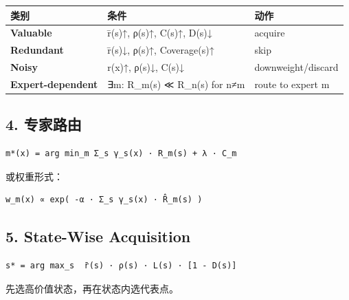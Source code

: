 \documentclass[
  12pt,
]{ctexart}
\begin{document}
\begin{longtable}[]{@{}
  >{\raggedright\arraybackslash}p{}
  >{\raggedright\arraybackslash}p{}
  >{\raggedright\arraybackslash}p{}@{}}
\toprule\noalign{}
\begin{minipage}[b]{\linewidth}\raggedright
类别
\end{minipage} & \begin{minipage}[b]{\linewidth}\raggedright
条件
\end{minipage} & \begin{minipage}[b]{\linewidth}\raggedright
动作
\end{minipage} \\
\midrule\noalign{}
\endhead
\bottomrule\noalign{}
\endlastfoot
\textbf{Valuable} & r̄(s)↑, ρ(s)↑, C(s)↑, D(s)↓ & acquire \\
\textbf{Redundant} & r̄(s)↓, ρ(s)↑, Coverage(s)↑ & skip \\
\textbf{Noisy} & r(x)↑, ρ(s)↓, C(s)↓ & downweight/discard \\
\textbf{Expert-dependent} & ∃m: R\_m(s) ≪ R\_n(s) for n≠m & route to
expert m \\
\end{longtable}

\subsection{4. 专家路由}\label{ux4e13ux5bb6ux8defux7531}

\begin{verbatim}
m*(x) = arg min_m Σ_s γ_s(x) · R_m(s) + λ · C_m
\end{verbatim}

或权重形式：

\begin{verbatim}
w_m(x) ∝ exp( -α · Σ_s γ_s(x) · R̂_m(s) )
\end{verbatim}

\subsection{5. State-Wise Acquisition}\label{state-wise-acquisition}

\begin{verbatim}
s* = arg max_s  r̄(s) · ρ(s) · L(s) · [1 - D(s)]
\end{verbatim}

先选高价值状态，再在状态内选代表点。
\end{document}
